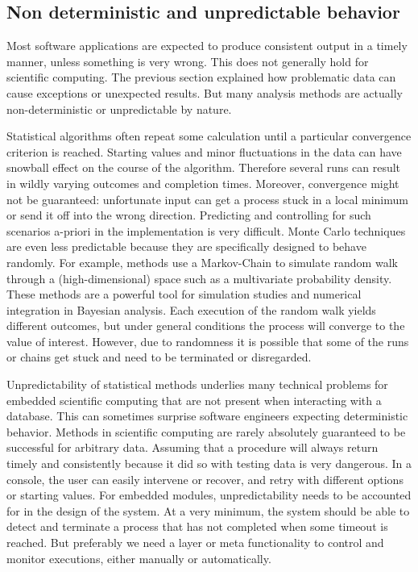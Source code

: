 \subsection{Non deterministic and unpredictable behavior}

Most software applications are expected to produce consistent output in a timely manner, unless something is very wrong. This does not generally hold for scientific computing. The previous section explained how problematic data can cause exceptions or unexpected results. But many analysis methods are actually non-deterministic or unpredictable by nature.

Statistical algorithms often repeat some calculation until a particular convergence criterion is reached. Starting values and minor fluctuations in the data can have snowball effect on the course of the algorithm. Therefore several runs can result in wildly varying outcomes and completion times. Moreover, convergence might not be guaranteed: unfortunate input can get a process stuck in a local minimum or send it off into the wrong direction. Predicting and controlling for such scenarios a-priori in the implementation is very difficult. Monte Carlo techniques are even less predictable because they are specifically designed to behave randomly. For example, \MCMC methods use a Markov-Chain to simulate random walk through a (high-dimensional) space such as a multivariate probability density. These methods are a powerful tool for simulation studies and numerical integration in Bayesian analysis. Each execution of the random walk yields different outcomes, but under general conditions the process will converge to the value of interest. However, due to randomness it is possible that some of the runs or chains get stuck and need to be terminated or disregarded.

Unpredictability of statistical methods underlies many technical problems for embedded scientific computing that are not present when interacting with a database. This can sometimes surprise software engineers expecting deterministic behavior. Methods in scientific computing are rarely absolutely guaranteed to be successful for arbitrary data. Assuming that a procedure will always return timely and consistently because it did so with testing data is very dangerous. In a console, the user can easily intervene or recover, and retry with different options or starting values. For embedded modules, unpredictability needs to be accounted for in the design of the system. At a very minimum, the system should be able to detect and terminate a process that has not completed when some timeout is reached. But preferably we need a layer or meta functionality to control and monitor executions, either manually or automatically. 

